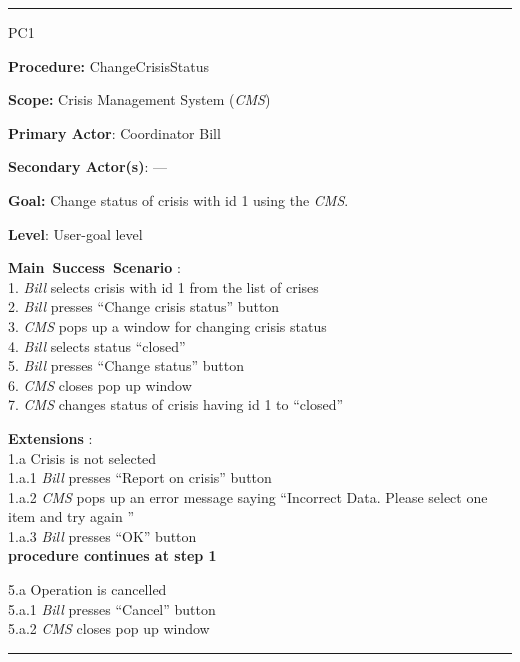 \vspace{0.5cm}
\hrule
\begin{lyxlist}{PC1}
\small{
\item [\textbf{Procedure:}] ChangeCrisisStatus
\item [\textbf{Scope:}] Crisis Management System (\emph{CMS})
\item [\textbf{Primary Actor}:] Coordinator Bill
\item [\textbf{Secondary Actor(s)}:] ---
\item [\textbf{Goal:}] Change status of crisis with id 1 using the \emph{CMS}.
\item [\textbf{Level}:] User-goal level
\item [\textbf{Main~Success~Scenario}]:\\
1. \emph{Bill} selects crisis with id 1 from the list of crises\\
2. \emph{Bill} presses ``Change crisis status'' button\\
3. \emph{CMS} pops up a window for changing crisis status\\
4. \emph{Bill} selects status ``closed''\\
5. \emph{Bill} presses ``Change status'' button\\
6. \emph{CMS} closes pop up window\\
7. \emph{CMS} changes status of crisis having id 1 to ``closed''\\

\item [\textbf{Extensions}]:\\
1.a Crisis is not selected\\
\hspace*{0.5cm} 1.a.1 \emph{Bill} presses ``Report on crisis'' button\\
\hspace*{0.5cm} 1.a.2 \emph{CMS} pops up an error message saying ``Incorrect
Data. Please select one item and try again ''\\
\hspace*{0.5cm} 1.a.3 \emph{Bill} presses ``OK'' button\\
\hspace*{0.5cm} \textbf{procedure continues at step 1}

5.a Operation is cancelled\\
\hspace*{0.5cm} 5.a.1 \emph{Bill} presses ``Cancel'' button\\
\hspace*{0.5cm} 5.a.2 \emph{CMS} closes pop up window\\
}
\end{lyxlist}
\hrule
\vspace{0.5cm}
